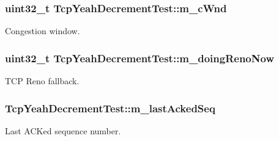 \subsubsection[{\texorpdfstring{m\+\_\+c\+Wnd}{m_cWnd}}]{\setlength{\rightskip}{0pt plus 5cm}uint32\+\_\+t Tcp\+Yeah\+Decrement\+Test\+::m\+\_\+c\+Wnd\hspace{0.3cm}{\ttfamily [private]}}\hypertarget{classTcpYeahDecrementTest_a51e21a89b0f5fcab90370db699a214e5}{}\label{classTcpYeahDecrementTest_a51e21a89b0f5fcab90370db699a214e5}


Congestion window. 

\subsubsection[{\texorpdfstring{m\+\_\+doing\+Reno\+Now}{m_doingRenoNow}}]{\setlength{\rightskip}{0pt plus 5cm}uint32\+\_\+t Tcp\+Yeah\+Decrement\+Test\+::m\+\_\+doing\+Reno\+Now\hspace{0.3cm}{\ttfamily [private]}}\hypertarget{classTcpYeahDecrementTest_ab8a89641d509b1895ffc3b4f24ef0573}{}\label{classTcpYeahDecrementTest_ab8a89641d509b1895ffc3b4f24ef0573}


T\+CP Reno fallback. 

\subsubsection[{\texorpdfstring{m\+\_\+last\+Acked\+Seq}{m_lastAckedSeq}}]{ Tcp\+Yeah\+Decrement\+Test\+::m\+\_\+last\+Acked\+Seq\hspace{0.3cm}{\ttfamily [private]}}\hypertarget{classTcpYeahDecrementTest_aebd4400138e26b4ccd0c9968be5ca60e}{}\label{classTcpYeahDecrementTest_aebd4400138e26b4ccd0c9968be5ca60e}


Last A\+C\+Ked sequence number. 

